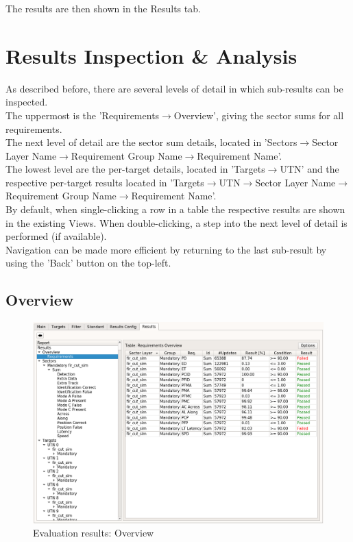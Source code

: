 The results are then shown in the Results tab.

\section{Results Inspection \& Analysis}
\label{sec:eval_inspect}

As described before, there are several levels of detail in which sub-results can be inspected.\\

The uppermost is the 'Requirements$\rightarrow$Overview', giving the sector sums for all requirements. \\

The next level of detail are the sector sum details, located in 'Sectors$\rightarrow$Sector Layer Name$\rightarrow$Requirement Group Name$\rightarrow$Requirement Name'. \\

The lowest level are the per-target details, located in 'Targets$\rightarrow$UTN' and the respective per-target results located in 'Targets$\rightarrow$UTN$\rightarrow$Sector Layer Name$\rightarrow$Requirement Group Name$\rightarrow$Requirement Name'. \\

By default, when single-clicking a row in a table the respective results are shown in the existing Views. When double-clicking, a step into the next level of detail is performed (if available). \\

Navigation can be made more efficient by returning to the last sub-result by using the 'Back' button on the top-left.

\subsection{Overview}
\begin{figure}[H]
  \hspace*{-2cm}
    \includegraphics[width=18cm,frame]{figures/eval_results_overview.png}
  \caption{Evaluation results: Overview}
\end{figure}


